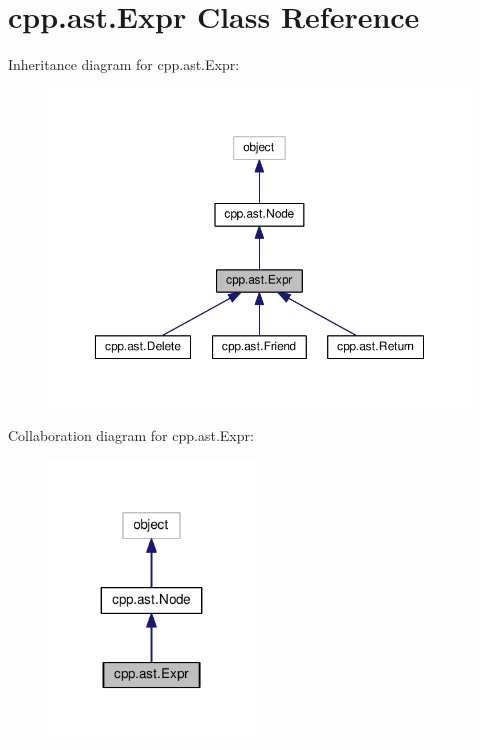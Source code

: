 \hypertarget{classcpp_1_1ast_1_1Expr}{}\section{cpp.\+ast.\+Expr Class Reference}
\label{classcpp_1_1ast_1_1Expr}


Inheritance diagram for cpp.\+ast.\+Expr\+:
\nopagebreak
\begin{figure}[H]
\begin{center}
\leavevmode
\includegraphics[width=350pt]{classcpp_1_1ast_1_1Expr__inherit__graph}
\end{center}
\end{figure}


Collaboration diagram for cpp.\+ast.\+Expr\+:
\nopagebreak
\begin{figure}[H]
\begin{center}
\leavevmode
\includegraphics[width=155pt]{classcpp_1_1ast_1_1Expr__coll__graph}
\end{center}
\end{figure}
